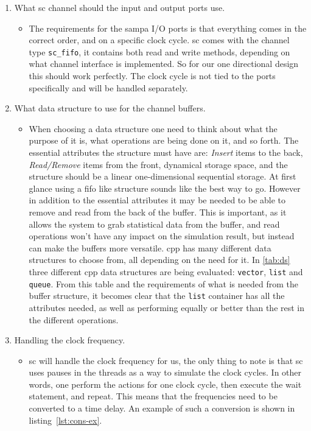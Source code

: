 \documentclass[a4paper, 12pt]{report}
\newcommand{\codeword}[1]{\texttt{#1}}
\begin{document}
\begin{enumerate}
	\item What \gls{sc} channel should the input and output ports use.
	
		\begin{itemize}
		\item The requirements for the \gls{sampa} I/O ports is that everything comes in the correct order, and on a specific clock cycle.
		\gls{sc} comes with the channel type \codeword{sc\_fifo}, it contains both read and write methods, depending on what channel interface is implemented.
		So for our one directional design this should work perfectly.
		The clock cycle is not tied to the ports specifically and will be handled separately.
		\end{itemize}	
		
	\item What data structure to use for the channel buffers.
		\begin{itemize}
\item When choosing a data structure one need to think about what the purpose of it is, what operations are being done on it, and so forth.
		The essential attributes the structure must have are: \textit{Insert} items to the back, \textit{Read/Remove} items from the front, dynamical storage space, and the structure should be a linear one-dimensional sequential storage.
		At first glance using a \gls{fifo} like structure sounds like the best way to go.
		However in addition to the essential attributes it may be needed to be able to remove and read from the back of the buffer.
		This is important, as it allows the system to grab statistical data from the buffer, and read operations won't have any impact on the simulation result, but instead can make the buffers more versatile.
		\gls{cpp} has many different data structures to choose from, all depending on the need for it.		
		In \ref{tab:ds} three different \gls{cpp} data structures are being evaluated: \codeword{vector}, \codeword{list} and \codeword{queue}.
		From this table and the requirements of what is needed from the buffer structure, it becomes clear that the \codeword{list} container has all the attributes needed, as well as performing equally or better than the rest in the different operations.
\end{itemize}
	\item Handling the clock frequency.
		\begin{itemize}
		\item \gls{sc} will handle the clock frequency for us, the only thing to note is that \gls{sc} uses pauses in the threads as a way to simulate the clock cycles.
		In other words, one perform the actions for one clock cycle, then execute the wait statement, and repeat.
		This means that the frequencies need to be converted to a time delay.	
		An example of such a conversion is shown in listing~\ref{lst:cons-ex}.
		\end{itemize}	
	
\end{enumerate}
\end{document}

